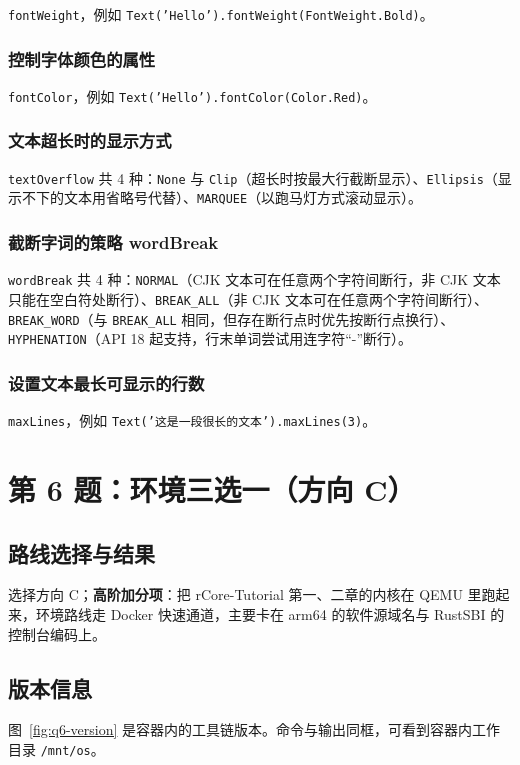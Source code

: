 \documentclass[a4paper, 12pt, linespread=1.35]{ctexart}   %
\begin{document}
\texttt{fontWeight}，例如 \texttt{Text('Hello').fontWeight(FontWeight.Bold)}。

\subsubsection{控制字体颜色的属性}

\texttt{fontColor}，例如 \texttt{Text('Hello').fontColor(Color.Red)}。

\subsubsection{文本超长时的显示方式}

\texttt{textOverflow} 共 4 种：\texttt{None} 与 \texttt{Clip}（超长时按最大行截断显示）、\texttt{Ellipsis}（显示不下的文本用省略号代替）、\texttt{MARQUEE}（以跑马灯方式滚动显示）。

\subsubsection{截断字词的策略 wordBreak}

\texttt{wordBreak} 共 4 种：\texttt{NORMAL}（CJK 文本可在任意两个字符间断行，非 CJK 文本只能在空白符处断行）、\texttt{BREAK\_ALL}（非 CJK 文本可在任意两个字符间断行）、\texttt{BREAK\_WORD}（与 \texttt{BREAK\_ALL} 相同，但存在断行点时优先按断行点换行）、\texttt{HYPHENATION}（API 18 起支持，行末单词尝试用连字符“-”断行）。

\subsubsection{设置文本最长可显示的行数}

\texttt{maxLines}，例如 \texttt{Text('这是一段很长的文本').maxLines(3)}。

\section{第 6 题：环境三选一（方向 C）}
\subsection{路线选择与结果}
选择方向 C；\textbf{高阶加分项}：把 rCore-Tutorial 第一、二章的内核在 QEMU 里跑起来，环境路线走 Docker 快速通道，主要卡在 arm64 的软件源域名与 RustSBI 的控制台编码上。

\subsection{版本信息}
图~\ref{fig:q6-version} 是容器内的工具链版本。命令与输出同框，可看到容器内工作目录 \texttt{/mnt/os}。
\end{document}
